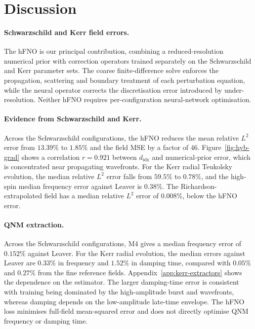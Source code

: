 \section{Discussion}\label{sec:discussion}

\paragraph{Schwarzschild and Kerr field errors.}
The hFNO is our principal contribution, combining a
reduced-resolution numerical prior with correction operators trained
separately on the Schwarzschild and Kerr parameter sets. The coarse
finite-difference solve enforces the propagation, scattering and
boundary treatment of each perturbation equation, while the neural
operator corrects the discretisation error introduced by
under-resolution. Neither hFNO requires per-configuration
neural-network optimisation.

\paragraph{Evidence from Schwarzschild and Kerr.}
Across the Schwarzschild configurations, the hFNO reduces the mean
relative $L^2$ error from $13.39\%$ to $1.85\%$ and the field MSE by
a factor of $46$. Figure~\ref{fig:hyb-grad} shows a correlation
$r=0.921$ between $d_{\mathrm{idx}}$ and numerical-prior error, which
is concentrated near propagating wavefronts. For the Kerr radial
Teukolsky evolution, the median relative $L^2$ error falls from
$59.5\%$ to $0.78\%$, and the high-spin median frequency
error against Leaver is $0.38\%$. The
Richardson-extrapolated field has a median relative $L^2$ error of
$0.008\%$, below the hFNO error.

\paragraph{QNM extraction.}
Across the Schwarzschild configurations, M4 gives a median frequency
error of $0.152\%$ against Leaver. For the Kerr radial evolution, the
median errors against Leaver are $0.33\%$ in frequency and $1.52\%$
in damping time, compared with $0.05\%$ and $0.27\%$ from the fine
reference fields. Appendix~\ref{app:kerr-extractors} shows the
dependence on the estimator. The larger damping-time
error is consistent with training being dominated by the
high-amplitude burst and wavefronts, whereas damping depends on the
low-amplitude late-time envelope. The hFNO loss minimises full-field
mean-squared error and does not directly optimise QNM frequency or
damping time.

